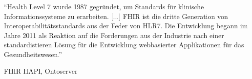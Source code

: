 "`Health Level 7 wurde 1987 gegründet, um Standards für klinische Informationssysteme zu erarbeiten. [...] FHIR ist die dritte Generation von Interoperabilitätsstandards aus der Feder von HLR7. Die Entwicklung begann im Jahre 2011 als Reaktion auf die Forderungen aus der Industrie nach einer standardistieren Lösung für die Entwicklung webbasierter Applikationen für das Gesundheitswesen."' \cite[Seite 309]{fhir-heckmann}

FHIR \cite{braunstein2022health} HAPI, Ontoserver

\begin{comment}
2 Einfiihrung in HL7* FHIR®

«Health Level 7* wurde 1987 gegriindet, um Standards fir klinische Informationssysteme
zu erarbeiten, Der Name der Organisation nimmt Bezug auf die siebte Schicht (Applica-
tion Layer) des ISO/OSI-Modells, und bringt damit zum Ausdruck, dass hier die Fest-
legung von anwendungsbezogenen Inhalten und Prozessen im Vordergrund steht, nicht die
Spezifikation von z. B. Ubertragungsprotokollen (HLT International, 2021).

HL7 ist vom nationalen amerikanischen Normeninstitut (ANSI) seit 1994 akkreditiert.
HLT verbundene, Organisationen, existieren inzwischen in tiber 40 Laindern. Die erste
nationale Partnergesellschaft wurde 1993 in Deutschland gegriindet. Die Aufgabe dieser
sogenannten ,,Affiliates* ist es, die Verbreitung und Implementierung der internationalen
HL7-Standards in dem jeweiligen Land zu férdern und gegebenenfalls erforderliche An-
passungen und Erweiterungen fiir deren Nutzung zu entwickeln, FHIR ist die dritte Gene-
ration von Interoperabilititsstandards aus der Feder von HLT.

Die Entwicklung began im Jahre 2011 als Reaktion auf die Forderungen aus der Indus-
trie nach einer isierten Losung fiir die Entwi ikationen fiir
das Gesundheitswesen. Der erste Entwurf der FHIR-Spezifikation stammt aus der Feder
von Grahame Grieve (AUS), Ewout Kramer (NL) und Lloyd McKenzie (CAD). Erste sta-
bile Versionen von FHIR wurden 2014 und 2015 mit dem Zusatz ,,DSTU* (Draft Standard
for Trial Use) publiziert und bereits von der Industrie zur Implementierung genutzt. Ins-
besondere die Version DSTU 2 wurde in den USA schnell aufgegriffen, obgleich der
«»DSTU*-Zusatz. den nicht-normativen Status dieser Publikationen hervorhebt. 2017 wurde
die dritte Version unter der Bezeichnung ,STU3" publiziert. Die vierte, 2018 veréffent-
lichte Version ,,R4* enthiilt erstmals normative Inhalte, Die Entwicklung des Standards ist
damit jedoch noch nicht abgeschlossen. Mit Hilfe eines ausgekliigelten Reifegradmodelles
wird der Entwicklungsstand einzelner Teile der Spezifikation regelmiibig bewertet. Norma-
tiven Status erhiilt ein Artefakt dann, wenn es geméi8 der Abstimmungsregein bei HL7
ballotiert, umfassend getestet und von mindestens fiinf unabhiingigen Hersteller in mehr
als einem Land unter produktiven Bedingungen implementiert wurde. Damit wird sicher-
gestellt, dass nichts normativ (und damit als weitgehend unvertinderlich) deklariert wird,
was nicht ausfiihrlich auf seine Nutzbarkeit unter Echtbedingungen hin getestet wurde.


\end{comment}
